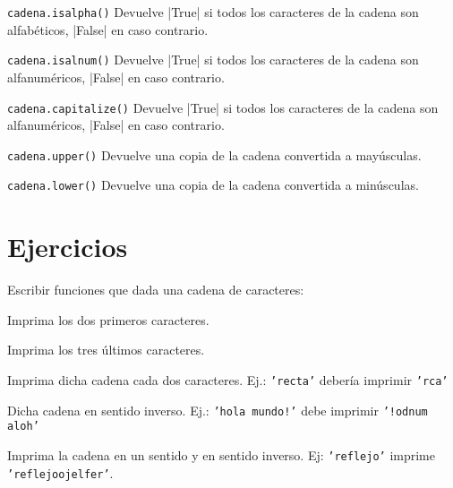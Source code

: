 \begin{referencia_python}
\begin{sintaxis}{\lstinline!cadena.isalpha()!}
Devuelve |True| si todos los caracteres de la cadena son alfabéticos, |False| en
caso contrario.
\end{sintaxis}

\begin{sintaxis}{\lstinline!cadena.isalnum()!}
Devuelve |True| si todos los caracteres de la cadena son alfanuméricos, |False| en
caso contrario.
\end{sintaxis}

\begin{sintaxis}{\lstinline!cadena.capitalize()!}
Devuelve |True| si todos los caracteres de la cadena son alfanuméricos, |False| en
caso contrario.
\end{sintaxis}

\begin{sintaxis}{\lstinline!cadena.upper()!}
Devuelve una copia de la cadena convertida a mayúsculas.
\end{sintaxis}

\begin{sintaxis}{\lstinline!cadena.lower()!}
Devuelve una copia de la cadena convertida a minúsculas.
\end{sintaxis}
\end{referencia_python}


\newpage
\section{Ejercicios}

\begin{ejercicio}
Escribir funciones que dada una cadena de caracteres:
\begin{partes}
\item Imprima los dos primeros caracteres.
\item Imprima los tres últimos caracteres.
\item Imprima dicha cadena cada dos caracteres. Ej.: \texttt{'recta'} debería
imprimir \texttt{'rca'}
\item Dicha cadena en sentido inverso. Ej.: \texttt{'hola mundo!'} debe
imprimir \texttt{'!odnum aloh'}
\item Imprima la cadena en un sentido y en sentido inverso. Ej:
\texttt{'reflejo'} imprime \texttt{'reflejoojelfer'}.
\end{partes}
\end{ejercicio}


